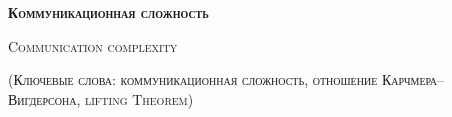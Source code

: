 


\thispagestyle{empty}

\centerline{\large \textsc{\textbf{Коммуникационная сложность}}}
\centerline{\textsc{Communication complexity}}
\centerline{\small \textsc{(Ключевые слова: коммуникационная сложность, отношение Карчмера--Вигдерсона,
        lifting Theorem)}}

\bigskip



\vspace{1cm}


\nocite{*}
\printbibliography



